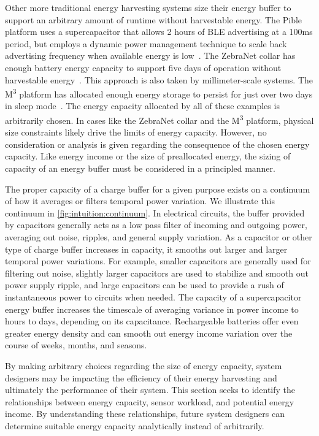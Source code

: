 
Other more traditional energy harvesting systems size their energy buffer to support an arbitrary amount of runtime without harvestable energy.
The Pible platform uses a supercapacitor that allows 2 hours of BLE advertising at a 100ms period, but employs a dynamic power management technique to scale back advertising frequency when available energy is low~\cite{fraternali2018pible}.
The ZebraNet collar has enough battery energy capacity to support five days of operation without harvestable energy~\cite{juang2002energy}.
This approach is also taken by millimeter-scale systems. The M\textsuperscript{3} platform has allocated enough energy storage to persist for just over two days in sleep mode~\cite{lee2013modular}.
The energy capacity allocated by all of these examples is arbitrarily chosen.
In cases like the ZebraNet collar and the M\textsuperscript{3} platform, physical size constraints likely drive the limits of energy capacity.
However, no consideration or analysis is given regarding the consequence of the chosen energy capacity.
Like energy income or the size of preallocated energy, the sizing of capacity of an energy buffer must be considered in a principled manner.

The proper capacity of a charge buffer for a given purpose exists on a continuum of how it averages or filters temporal power variation.
We illustrate this continuum in \cref{fig:intuition:continuum}.
In electrical circuits, the buffer provided by capacitors generally acts as a low pass filter of incoming and outgoing power, averaging out noise, ripples, and general supply variation.
As a capacitor or other type of charge buffer increases in capacity, it smooths out larger and larger temporal power variations. 
For example, smaller capacitors are generally used for filtering out noise, slightly larger capacitors are used to stabilize and smooth out power supply ripple, and large capacitors can be used to provide a rush of instantaneous power to circuits when needed.
The capacity of a supercapacitor energy buffer increases the timescale of averaging variance in power income to hours to days, depending on its capacitance.
Rechargeable batteries offer even greater energy density and can smooth out energy income variation over the course of weeks, months, and seasons.

By making arbitrary choices regarding the size of energy capacity, system designers may be impacting the efficiency of their energy harvesting and ultimately the performance of their system.
This section seeks to identify the relationships between energy capacity, sensor workload, and potential energy income.
By understanding these relationships, future system designers can determine suitable energy capacity analytically
instead of arbitrarily.  

